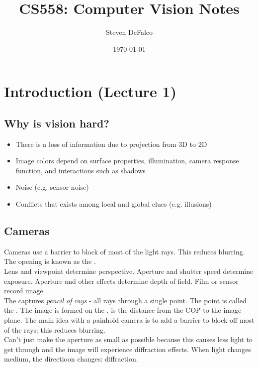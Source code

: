 \documentclass{article}
\title{CS558: Computer Vision Notes}
\author{Steven DeFalco}
\date{\today}
\begin{document}
\maketitle
\tableofcontents
\newpage



\section{Introduction (Lecture 1)}

\subsection{Why is vision hard?}

\begin{itemize}
  \item There is a loss of information due to projection from 3D to 2D 
  \item Image colors depend on surface properties, illumination, camera response function, and interactions such as shadows 
  \item Noise (e.g. sensor noise)
  \item Conflicts that exists among local and global clues (e.g. illusions)
\end{itemize}

\subsection{Cameras}

Cameras use a barrier to block of most of the light rays. This reduces blurring. The opening is known as the . \\ 

Lens and viewpoint determine perspective. Aperture and shutter speed determine exposure. Aperture and other effects determine depth of field. Film or sensor record image. \\

The  captures \emph{pencil of rays} - all rays through a single point. The point is called the . The image is formed on the .  is the distance from the COP to the image plane. The main idea with a painhold camera is to add a barrier to block off most of the rays: this reduces blurring. \\ 

Can't just make the aperture as small as possible because this causes less light to get through and the image will experience diffraction effects. When light changes medium, the directioon changes: diffraction. \\ 
\end{document}
